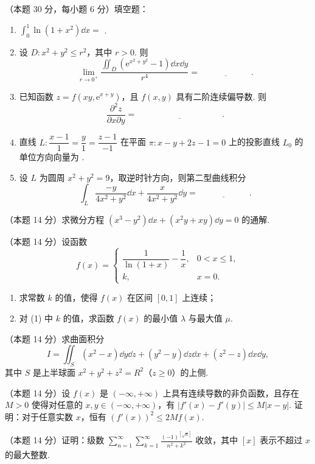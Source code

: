 
\begin{problems}
\item[一、]（本题 30 分，每小题 6 分）填空题：
\begin{enumerate}
\item $\displaystyle\int_0^1 \ln(1+x^2)\dd x=$ \underline{\hspace{6em}}.
\item 设 $D: x^2+y^2\le r^2$，其中 $r>0$. 则
\[ \lim_{r\to 0^+}\frac{\iint_D (\mathrm{e}^{x^2+y^2}-1)\dd x\dd y}{r^4}=\underline{\hspace{6em}}. \]
\item 已知函数 $z=f(xy,\mathrm{e}^{x+y})$，且 $f(x,y)$ 具有二阶连续偏导数. 则
\[ \frac{\partial^2 z}{\partial x\partial y}=\underline{\hspace{10em}}. \]
\item 直线 $L:\dfrac{x-1}{1}=\dfrac{y}{1}=\dfrac{z-1}{-1}$ 在平面 $\pi: x-y+2z-1=0$ 上的投影直线 $L_0$ 的单位方向向量为 \underline{\hspace{6em}}.
\item 设 $L$ 为圆周 $x^2+y^2=9$，取逆时针方向，则第二型曲线积分
\[ \int_L \frac{-y}{4x^2+y^2}\dd x+\frac{x}{4x^2+y^2}\dd y=\underline{\hspace{6em}}. \]
\end{enumerate}
\item[二、]（本题 14 分）求微分方程 $(x^3-y^2)\dd x+(x^2y+xy)\dd y=0$ 的通解.
\item[三、]（本题 14 分）设函数
\[ f(x)=\begin{cases}\dfrac{1}{\ln(1+x)}-\dfrac{1}{x}, & 0<x\le 1,\\[6pt] k, & x=0.\end{cases} \]
\begin{enumerate}
\item 求常数 $k$ 的值，使得 $f(x)$ 在区间 $[0,1]$ 上连续；
\item 对 (1) 中 $k$ 的值，求函数 $f(x)$ 的最小值 $\lambda$ 与最大值 $\mu$.
\end{enumerate}
\item[四、]（本题 14 分）求曲面积分
\[ I=\iint_S (x^2-x)\dd y\dd z+(y^2-y)\dd z\dd x+(z^2-z)\dd x\dd y, \]
其中 $S$ 是上半球面 $x^2+y^2+z^2=R^2$（$z\ge 0$）的上侧.
\item[五、]（本题 14 分）设 $f(x)$ 是 $(-\infty,+\infty)$ 上具有连续导数的非负函数，且存在 $M>0$ 使得对任意的 $x,y\in(-\infty,+\infty)$，有 $|f'(x)-f'(y)|\le M|x-y|$. 证明：对于任意实数 $x$，恒有 $(f'(x))^2\le 2Mf(x)$.
\item[六、]（本题 14 分）证明：级数 $\displaystyle\sum_{n=1}^{\infty}\sum_{k=1}^{\infty}\frac{(-1)^{[\sqrt{n}]}}{n^2+k^2}$ 收敛，其中 $[x]$ 表示不超过 $x$ 的最大整数.
\end{problems}
